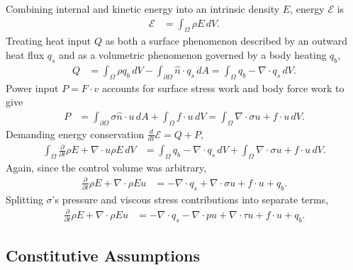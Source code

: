 Combining internal and kinetic energy into an intrinsic density $E$,
energy $\mathscr{E}$ is
\begin{align}
  \mathscr{E} &= \int_{\Omega} \rho{}E \, dV
  .
\end{align}
Treating heat input $Q$ as both a surface phenomenon described by an outward
heat flux $q_{s}$ and as a volumetric phenomenon governed by a
body heating $q_{b}$,
\begin{align}
  Q
  &=
   \int_{\Omega}\rho{}q_{b}\,dV
  -\int_{\partial\!\Omega}\hat{n}\cdot{}q_{s}\,dA
  =
    \int_{\Omega}q_{b} - \nabla\cdot{}q_{s}\,dV
  .
\end{align}
Power input $P=F\cdot{}v$ accounts for surface stress work and body
force work to give
\begin{align}
  P
  &=
    \int_{\partial\!\Omega} \sigma{}\hat{n} \cdot{} u \, dA
  + \int_{\Omega} f \cdot{} u \, dV
  = \int_{\Omega} \nabla\cdot{}\sigma{}u + f \cdot{} u \, dV
  .
\end{align}
Demanding energy conservation $\frac{d}{dt}\mathscr{E}=Q+P$,
\begin{align}
  \int_{\Omega}\frac{\partial\!}{\partial\!t} \rho{}E
  +
  \nabla\cdot{}u\rho{}E
  \,dV
&=
    \int_{\Omega} q_{b} - \nabla\cdot{}q_{s}\,dV
  + \int_{\Omega} \nabla\cdot\sigma{}u + f \cdot{} u \, dV
  .
\end{align}
Again, since the control volume was arbitrary,
\begin{align}
  \frac{\partial\!}{\partial\!t} \rho{}E
  +
  \nabla\cdot{}\rho{}Eu
&=
  - \nabla\cdot{}q_{s}
  + \nabla\cdot\sigma{}u
  + f \cdot{} u
  + q_{b}
  .
\end{align}
Splitting $\sigma$'s pressure and viscous stress contributions into separate
terms,
\begin{align}
  \label{eq:cons_energy}
  \frac{\partial\!}{\partial\!t} \rho{}E
  +
  \nabla\cdot{}\rho{}Eu
&=
  - \nabla\cdot{}q_{s}
  - \nabla\cdot{}pu
  + \nabla\cdot{}\tau{}u
  + f \cdot{} u
  + q_{b}
  .
\end{align}

\subsection{Constitutive Assumptions}
\label{sec:constitutive}


